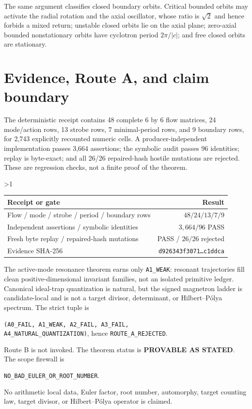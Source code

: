 \documentclass[10pt]{article}
\providecommand{\CRevisionRound}{2}
\begin{document}
The same argument classifies closed boundary orbits.  Critical bounded orbits
may activate the radial rotation and the axial oscillator, whose ratio is
$\sqrt2$ and hence forbids a mixed return; unstable closed orbits lie on the
axial plane; zero-axial bounded nonstationary orbits have cyclotron period
$2\pi/|c|$; and free closed orbits are stationary.
\fi

\section{Evidence, Route A, and claim boundary}
The deterministic receipt contains 48 complete $6$ by $6$ flow matrices, 24
mode/action rows, 13 strobe rows, 7 minimal-period rows, and 9 boundary rows,
for 2,743 explicitly recounted numeric cells.  A producer-independent
implementation passes 3,664 assertions; the symbolic audit passes 96
identities; replay is byte-exact; and all 26/26 repaired-hash hostile mutations
are rejected.  These are regression checks, not a finite proof of the theorem.

\ifnum\CRevisionRound>1
\begin{center}
\small
\begin{tabular}{@{}lr@{}}
\toprule
Receipt or gate & Result\\
\midrule
Flow / mode / strobe / period / boundary rows & $48/24/13/7/9$\\
Independent assertions / symbolic identities & $3{,}664/96$ PASS\\
Fresh byte replay / repaired-hash mutations & PASS / $26/26$ rejected\\
Evidence SHA-256 & \texttt{d926343f3071\ldots c1ddca}\\
\bottomrule
\end{tabular}
\end{center}
\fi

The active-mode resonance theorem earns only \texttt{A1\_WEAK}: resonant
trajectories fill clean positive-dimensional invariant families, not an
isolated primitive ledger.  Canonical ideal-trap quantization is natural, but
the signed magnetron ladder is candidate-local and is not a target divisor,
determinant, or Hilbert--P\'olya spectrum.  The strict tuple is
\begin{center}\small
\texttt{(A0\_FAIL, A1\_WEAK, A2\_FAIL, A3\_FAIL,}\\
\texttt{A4\_NATURAL\_QUANTIZATION)}, hence \texttt{ROUTE\_A\_REJECTED}.
\end{center}
Route B is not invoked.  The theorem status is \textbf{PROVABLE AS STATED}.
The scope firewall is
\begin{center}\small
\texttt{NO\_BAD\_EULER\_OR\_ROOT\_NUMBER}.
\end{center}
No arithmetic local data, Euler factor, root number, automorphy, target counting
law, target divisor, or Hilbert--P\'olya operator is claimed.
\end{document}

